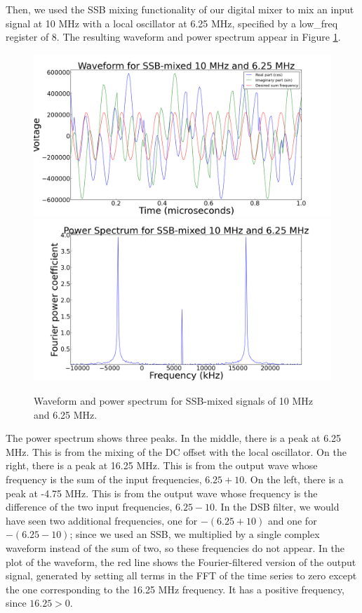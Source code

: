 \documentclass[11pt]{article}
\begin{document}
Then, we used the SSB mixing functionality of our digital mixer to mix an input signal at 10 MHz with a local oscillator at 6.25 MHz, specified by a low\_freq register of 8. The resulting waveform and power spectrum appear in Figure \ref{ssb}.

\begin{figure}
\centering
\includegraphics[scale=0.35]{pictures/ssbwave}
\includegraphics[scale=0.35]{pictures/ssbpower}
\caption{Waveform and power spectrum for SSB-mixed signals of 10 MHz and 6.25 MHz. \label{ssb}}
\end{figure}

The power spectrum shows three peaks. In the middle, there is a peak at 6.25 MHz. This is from the mixing of the DC offset with the local oscillator. On the right, there is a peak at 16.25 MHz. This is from the output wave whose frequency is the sum of the input frequencies, $6.25 + 10$. On the left, there is a peak at -4.75 MHz. This is from the output wave whose frequency is the difference of the two input frequencies, $6.25-10$. In the DSB filter, we would have seen two additional frequencies, one for $-(6.25 + 10)$ and one for $-(6.25 - 10)$; since we used an SSB, we multiplied by a single complex waveform instead of the sum of two, so these frequencies do not appear. In the plot of the waveform, the red line shows the Fourier-filtered version of the output signal, generated by setting all terms in the FFT of the time series to zero except the one corresponding to the 16.25 MHz frequency. It has a positive frequency, since $16.25 > 0$. 
\end{document}
